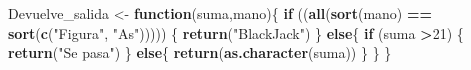 \documentclass[12pt,a4paper,]{book}
\newenvironment{Shaded}{\begin{snugshade}}{\end{snugshade}}
\newcommand{\ControlFlowTok}[1]{\textcolor[rgb]{0.13,0.29,0.53}{\textbf{#1}}}
\newcommand{\DecValTok}[1]{\textcolor[rgb]{0.00,0.00,0.81}{#1}}
\newcommand{\FunctionTok}[1]{\textcolor[rgb]{0.13,0.29,0.53}{\textbf{#1}}}
\newcommand{\NormalTok}[1]{#1}
\newcommand{\OtherTok}[1]{\textcolor[rgb]{0.56,0.35,0.01}{#1}}
\newcommand{\SpecialCharTok}[1]{\textcolor[rgb]{0.81,0.36,0.00}{\textbf{#1}}}
\newcommand{\StringTok}[1]{\textcolor[rgb]{0.31,0.60,0.02}{#1}}
\numberwithin{dummy}{section}
\theoremstyle{ocrenumbox}
\theoremstyle{blacknumex}
\theoremstyle{blacknumbox}
\theoremstyle{ocrenum}
\theoremstyle{ocrenum}
\begin{document}
\begin{Shaded}
\begin{Highlighting}[]
\NormalTok{Devuelve\_salida }\OtherTok{\textless{}{-}} \ControlFlowTok{function}\NormalTok{(suma,mano)\{}
  \ControlFlowTok{if}\NormalTok{ ((}\FunctionTok{all}\NormalTok{(}\FunctionTok{sort}\NormalTok{(mano) }\SpecialCharTok{==} \FunctionTok{sort}\NormalTok{(}\FunctionTok{c}\NormalTok{(}\StringTok{"Figura"}\NormalTok{, }\StringTok{"As"}\NormalTok{))))) \{}
    \FunctionTok{return}\NormalTok{(}\StringTok{"BlackJack"}\NormalTok{)}
\NormalTok{  \} }\ControlFlowTok{else}\NormalTok{\{}
    \ControlFlowTok{if}\NormalTok{ (suma }\SpecialCharTok{\textgreater{}}\DecValTok{21}\NormalTok{) \{}
      \FunctionTok{return}\NormalTok{(}\StringTok{"Se pasa"}\NormalTok{)}
\NormalTok{    \} }\ControlFlowTok{else}\NormalTok{\{}
      \FunctionTok{return}\NormalTok{(}\FunctionTok{as.character}\NormalTok{(suma))}
\NormalTok{    \}}
\NormalTok{  \} }
\NormalTok{\} }



\end{Highlighting}
\end{Shaded}
\end{document}
